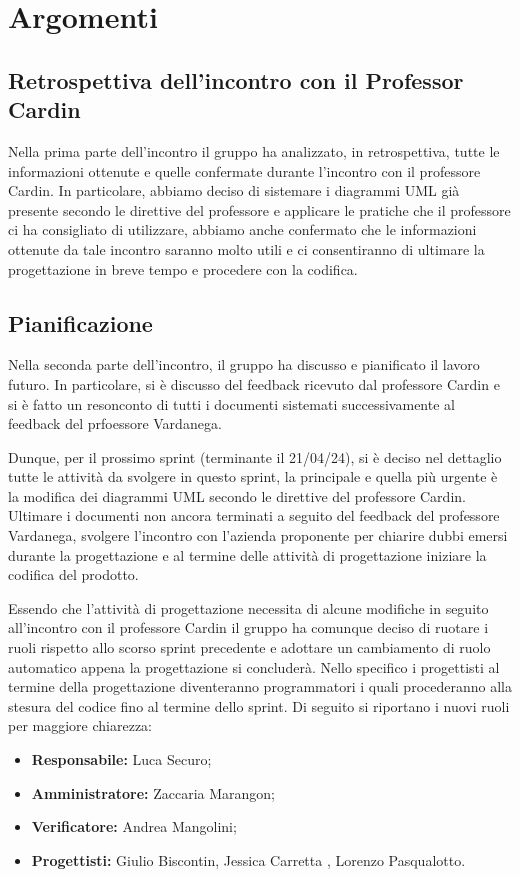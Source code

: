 \section{Argomenti}
\subsection{Retrospettiva dell'incontro con il Professor Cardin}
Nella prima parte dell'incontro il gruppo ha analizzato, in retrospettiva, tutte le informazioni ottenute e quelle confermate durante l'incontro con il professore Cardin.
In particolare, abbiamo deciso di sistemare i diagrammi UML già presente secondo le direttive del professore e applicare le pratiche che il professore ci ha consigliato di utilizzare, 
abbiamo anche confermato che le informazioni ottenute da tale incontro saranno molto utili e ci consentiranno di ultimare la progettazione in breve tempo e procedere con la codifica.

\subsection{Pianificazione}
\noindent Nella seconda parte dell'incontro, il gruppo ha discusso e pianificato il lavoro futuro. In particolare, si è discusso del feedback ricevuto dal professore Cardin e si è 
fatto un resonconto di tutti i documenti sistemati successivamente al feedback del prfoessore Vardanega.
\bigskip

\noindent Dunque, per il prossimo sprint (terminante il 21/04/24), si è deciso nel dettaglio tutte le attività da svolgere in questo sprint, la principale e quella più urgente è 
la modifica dei diagrammi UML secondo le direttive del professore Cardin. Ultimare i documenti non ancora terminati a seguito del feedback del professore Vardanega, 
svolgere l'incontro con l'azienda proponente per chiarire dubbi emersi durante la progettazione e al termine delle attività di progettazione iniziare la codifica del prodotto.
\bigskip

\noindent Essendo che l'attività di progettazione necessita di alcune modifiche in seguito all'incontro con il professore Cardin il gruppo ha comunque deciso di ruotare
i ruoli rispetto allo scorso sprint precedente e adottare un cambiamento di ruolo automatico appena la progettazione si concluderà.
Nello specifico i progettisti al termine della progettazione diventeranno programmatori i quali procederanno alla stesura del codice fino al termine dello sprint. 
Di seguito si riportano i nuovi ruoli per maggiore chiarezza:
\begin{itemize}
    \item \textbf{Responsabile:} Luca Securo;
    \item \textbf{Amministratore:} Zaccaria Marangon;
    \item \textbf{Verificatore:} Andrea Mangolini;
    \item \textbf{Progettisti:} Giulio Biscontin, Jessica Carretta , Lorenzo Pasqualotto.
\end{itemize}